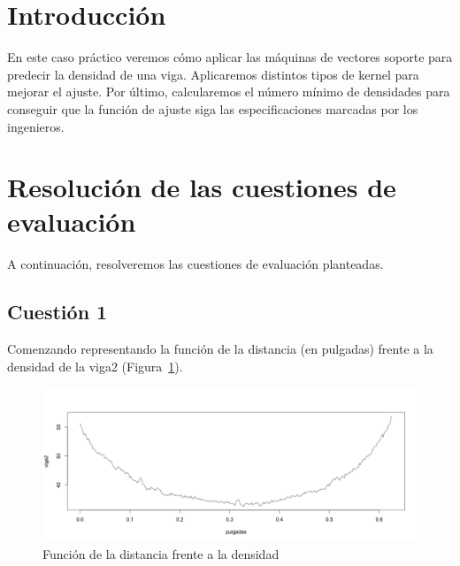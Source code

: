 \documentclass[12pt,a4paper,twoside,openright,titlepage,final]{article}
\author{José Ignacio Escribano}
\title{}
\begin{document}
\setcounter{page}{1}


\listoffigures
\thispagestyle{empty}
\newpage

\listoftables
\thispagestyle{empty}
\newpage

\tableofcontents
\thispagestyle{empty}
\newpage


\setcounter{page}{1}

\section{Introducción}

En este caso práctico veremos cómo aplicar las máquinas de vectores soporte para predecir la densidad de una viga. Aplicaremos distintos tipos de kernel para mejorar el ajuste. Por último, calcularemos el número mínimo de densidades para conseguir que la función de ajuste siga las especificaciones marcadas por los ingenieros. 

\section{Resolución de las cuestiones de evaluación}

A continuación, resolveremos las cuestiones de evaluación planteadas.

\subsection{Cuestión 1}

Comenzando representando la función de la distancia (en pulgadas) frente a la densidad de la viga2 (Figura~\ref{fig:plot_viga2_inicial}).\\

\begin{figure}
\centering
\includegraphics[width=0.8\linewidth]{imagenes/plot_viga2_inicial}
\caption{Función de la distancia frente a la densidad}
\label{fig:plot_viga2_inicial}
\end{figure}
\end{document}
